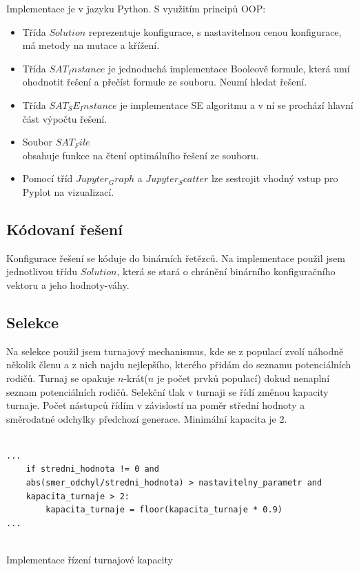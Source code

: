 \documentclass{article}
\begin{document}
Implementace je v jazyku Python. S využitím principů OOP:
\begin{itemize}
\item Třída \(Solution\) reprezentuje konfigurace, s nastavitelnou cenou konfigurace, má metody na mutace a křížení.
\item Třída \(SAT_Instance\) je jednoduchá implementace Booleově formule, která umí ohodnotit řešení a přečíst formule ze souboru. Neumí hledat řešení.
\item Třída \(SAT_SE_Instance\) je implementace SE algoritmu a v ní se prochází hlavní část výpočtu řešení.
\item Soubor \(SAT_File\)\\ obsahuje funkce na čtení optimálního řešení ze souboru.
\item Pomocí tříd \(Jupyter_Graph\) a \(Jupyter_Scatter\) lze sestrojit vhodný vstup pro Pyplot na vizualizací.
\end{itemize}


\subsection{Kódovaní řešení}

Konfigurace řešení se kóduje do binárních řetězců. Na implementace použil jsem jednotlivou třídu \(Solution\), která se stará o chránění binárního konfiguračního vektoru a jeho hodnoty-váhy.


\subsection{Selekce}

Na selekce použil jsem turnajový mechanismus, kde se z populací zvolí náhodně několik členu a z nich najdu nejlepšího, kterého přidám do seznamu potenciálních rodičů. Turnaj se opakuje \(n\)-krát(\(n\) je počet prvků populací) dokud nenaplní seznam potenciálních rodičů. Selekční tlak v turnaji se řídí změnou kapacity turnaje. Počet nástupců řídím v závislostí na poměr střední hodnoty a směrodatné odchylky předchozí generace. Minimální kapacita je 2.

\begin{listing}[H]
\begin{verbatim}
        
...        
    if stredni_hodnota != 0 and
    abs(smer_odchyl/stredni_hodnota) > nastavitelny_parametr and
    kapacita_turnaje > 2:
        kapacita_turnaje = floor(kapacita_turnaje * 0.9)
...
               
\end{verbatim}
\caption{Implementace řízení turnajové kapacity}
\label{implementace:tournament}
\end{listing}
\end{document}
